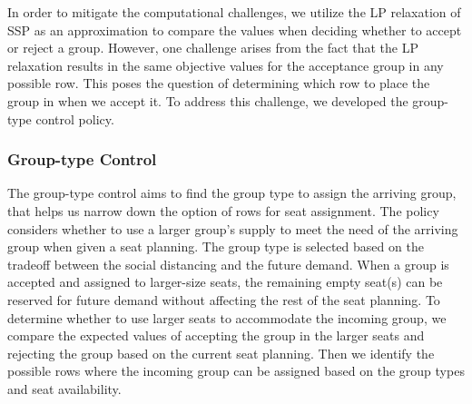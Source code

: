 In order to mitigate the computational challenges, we utilize the LP relaxation of SSP as an approximation to compare the values when deciding whether to accept or reject a group. However, one challenge arises from the fact that the LP relaxation results in the same objective values for the acceptance group in any possible row. This poses the question of determining which row to place the group in when we accept it. To address this challenge, we developed the group-type control policy.

\subsubsection{Group-type Control}\label{nested_policy}



The group-type control aims to find the group type to assign the arriving group, that helps us narrow down the option of rows for seat assignment. The policy considers whether to use a larger group's supply to meet the need of the arriving group when given a seat planning. The group type is selected based on the tradeoff between the social distancing and the future demand. When a group is accepted and assigned to larger-size seats, the remaining empty seat(s) can be reserved for future demand without affecting the rest of the seat planning. To determine whether to use larger seats to accommodate the incoming group, we compare the expected values of accepting the group in the larger seats and rejecting the group based on the current seat planning. Then we identify the possible rows where the incoming group can be assigned based on the group types and seat availability.

